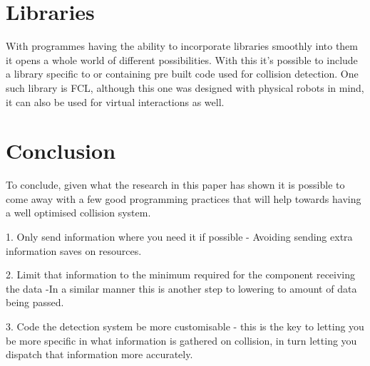 \documentclass{scrartcl}
\begin{document}
	\section{Libraries}
	With programmes having the ability to incorporate libraries smoothly into them it opens a whole world of different possibilities\cite{kula2017exploratory}. With this it's possible to include a library specific to or containing pre built code used for collision detection. One such library is FCL\cite{pan2012fcl}, although this one was designed with physical robots in mind, it can also be used for virtual interactions as well.
	
	
	\section{Conclusion}
	
	To conclude, given what the research in this paper has shown it is possible to come away with a few good programming practices that will help towards having a well optimised collision system. 
	
	1. Only send information where you need it if possible - Avoiding sending extra information saves on resources.
	
	2. Limit that information to the minimum required for the component receiving the data -In a similar manner this is another step to lowering to amount of data being passed.
	
	3. Code the detection system be more customisable - this is the key to letting you be more specific in what information is gathered on collision, in turn letting you dispatch that information more accurately.

	
	
	
	
	
\end{document}
